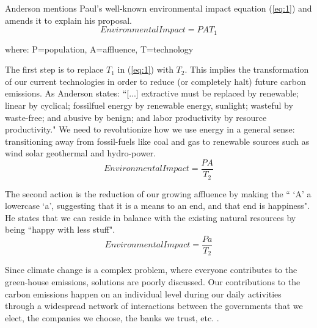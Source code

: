 \documentclass[11pt,a4paper]{article}
\begin{document}
Anderson mentions Paul's well-known environmental impact equation (\ref{eq:1}) and amends it to explain his proposal.
\begin{equation} \label{eq:1}
EnvironmentalImpact = P A T_1
\end{equation}
\begin{flushright} \parencite{Hawken1993} \end{flushright}
where: P=population, A=affluence, T=technology

The first step is to replace $T_1$ in (\ref{eq:1}) with $T_2$. This implies the transformation of our current technologies in order to reduce (or completely halt) future carbon emissions. As Anderson states: ``[...] extractive must be replaced by renewable; linear by cyclical; fossilfuel energy by renewable energy, sunlight; wasteful by waste-free; and abusive by benign; and labor productivity by resource productivity." We need to revolutionize how we use energy in a general sense: transitioning away from fossil-fuels like coal and gas to renewable sources such as wind solar geothermal and hydro-power.
\begin{equation} \label{eq:2}
Environmental Impact = \dfrac{P A}{T_2}
\end{equation}
\begin{flushright} \parencite{Anderson2009} \end{flushright}

The second action is the reduction of our growing affluence by making the `` `A' a lowercase `a', suggesting that it is a means to an end, and that end is happiness". \parencite{Anderson2009} He states that we can reside in balance with the existing natural resources by being ``happy with less stuff".
\begin{equation} \label{eq:3}
Environmental Impact = \dfrac{P a}{T_2}
\end{equation}
\begin{flushright} \parencite{Anderson2009} \end{flushright}


Since climate change is a complex problem, where everyone contributes to the green-house emissions, solutions are poorly discussed. Our contributions to the carbon emissions happen on an individual level during our daily activities through a widespread network of interactions between the governments that we elect, the companies we choose, the banks we trust, etc. .
\end{document}
